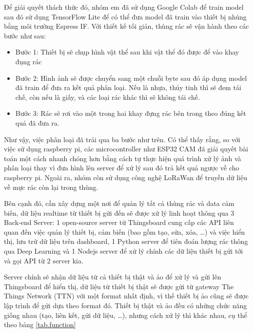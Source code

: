 Để giải quyết thách thức đó, nhóm em đã sử dụng Google Colab để train model sau đó sử dụng TensorFlow Lite để có thể đưa model đã train vào thiết bị nhúng bằng môi trường Espress IF.
Với thiết kế tối giản, thùng rác sẽ vận hành theo các bước như sau: 
\begin{itemize}
    \item Bước 1: Thiết bị sẽ chụp hình vật thể sau khi vật thể đó được để vảo khay đụng rác
    \item Bước 2: Hình ảnh sẽ được chuyển sang một chuỗi byte sau đó áp dụng model đã train để đưa ra kết quả phân loại. Nếu là nhựa, thủy tinh thì sẽ đem tái chế, còn nếu là giấy, và các loại rác khác thì sẽ không tái chế.
    \item Bước 3: Rác sẽ rơi vào một trong hai khay đựng rác bên trong theo đúng kết quả đã đưa ra.
\end{itemize}
Như vậy, việc phân loại đã trải qua ba bước như trên.
Có thể thấy rằng, so với việc sử dụng raspberry pi, các microcontroller như ESP32 CAM đã giải quyết bài toán một cách nhanh chóng hơn bằng cách tự thực hiện quá trình xử lý ảnh và phân loại thay vì đưa hình lên server để xử lý sau đó trả kết quả ngược về cho raspberry pi.
Ngoài ra, nhóm còn sử dụng công nghệ LoRaWan để truyền dữ liệu về mực rác còn lại trong thùng.


Bên cạnh đó, cần xây dựng một nơi để quản lý tất cả thùng rác và data cảm biến, dữ liệu realtime từ thiết bị gửi đến sẽ được xử lý linh hoạt thông qua 3 Back-end Server: 1 open-source server từ Thingsboard cung cấp các API liên quan đến việc quản lý thiết bị, cảm biến (bao gồm tạo, sửa, xóa, …) và việc hiển thị, lưu trữ dữ liệu trên dashboard, 1 Python server để tiên đoán lượng rác thông qua Deep Learning và 1 Nodejs server để xử lý chính các dữ liệu thiết bị gửi tới và gọi API từ 2 server kia.

Server chính sẽ nhận dữ liệu từ cả thiết bị thật và ảo để xử lý và gửi lên Thingsboard để hiển thị, dữ liệu từ thiết bị thật sẽ được gửi từ gateway The Things Network (TTN) với một format nhất định, vì thế thiết bị ảo cũng sẽ được lập trình để gửi dựa theo format đó. Thiết bị thật và ảo đều có những chức năng giống nhau (tạo, liên kết, gửi dữ liệu, …), nhưng cách xử lý thì khác nhau, cụ thể theo bảng \ref{tab.function}

